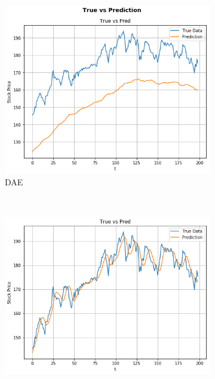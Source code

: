 \documentclass[11pt]{article}
\begin{document}
\begin{figure}
    ~ %
    \begin{subfigure}[b]{0.3\textwidth}
        \includegraphics[width=\textwidth]{media/result-dae}
        \caption{DAE}
        \label{fig:result-dae}
    \end{subfigure}
    ~ %
    \begin{subfigure}[b]{0.3\textwidth}
        \includegraphics[width=\textwidth]{media/result-lstm}

\end{subfigure}
\end{figure}
\end{document}
